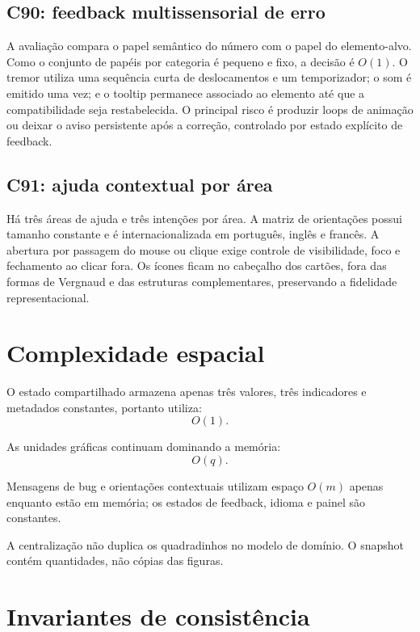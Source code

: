 \documentclass[12pt,a4paper]{article}
\begin{document}
\subsection{C90: feedback multissensorial de erro}
A avaliação compara o papel semântico do número com o papel do elemento-alvo. Como o conjunto de papéis por categoria é pequeno e fixo, a decisão é $O(1)$. O tremor utiliza uma sequência curta de deslocamentos e um temporizador; o som é emitido uma vez; e o tooltip permanece associado ao elemento até que a compatibilidade seja restabelecida. O principal risco é produzir loops de animação ou deixar o aviso persistente após a correção, controlado por estado explícito de feedback.

\subsection{C91: ajuda contextual por área}
Há três áreas de ajuda e três intenções por área. A matriz de orientações possui tamanho constante e é internacionalizada em português, inglês e francês. A abertura por passagem do mouse ou clique exige controle de visibilidade, foco e fechamento ao clicar fora. Os ícones ficam no cabeçalho dos cartões, fora das formas de Vergnaud e das estruturas complementares, preservando a fidelidade representacional.

\section{Complexidade espacial}

O estado compartilhado armazena apenas três valores, três indicadores e metadados constantes, portanto utiliza:
\[
O(1).
\]

As unidades gráficas continuam dominando a memória:
\[
O(q).
\]

Mensagens de bug e orientações contextuais utilizam espaço $O(m)$ apenas enquanto estão em memória; os estados de feedback, idioma e painel são constantes.

A centralização não duplica os quadradinhos no modelo de domínio. O snapshot contém quantidades, não cópias das figuras.

\section{Invariantes de consistência}
\end{document}

